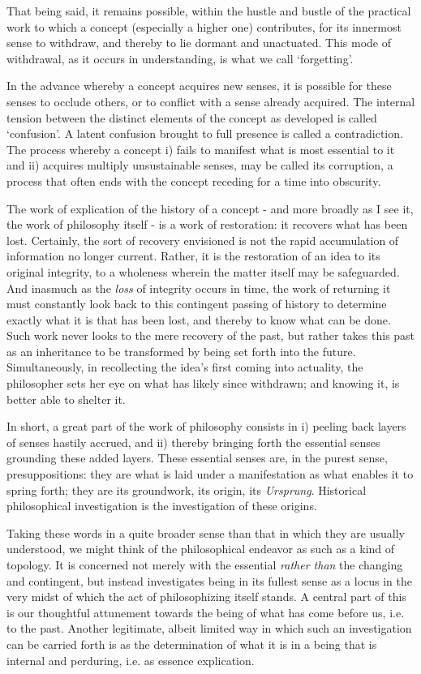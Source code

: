 \documentclass[]{article}
\begin{document}
That being said, it remains possible, within the hustle and bustle of the practical work to which a concept (especially a higher one) contributes, for its innermost sense to withdraw, and thereby to lie dormant and unactuated. This mode of withdrawal, as it occurs in understanding, is what we call `forgetting'.

In the advance whereby a concept acquires new senses, it is possible for these senses to occlude others, or to conflict with a sense already acquired. The internal tension between the distinct elements of the concept as developed is called `confusion'. A latent confusion brought to full presence is called a contradiction. The process whereby a concept i) fails to manifest what is most essential to it and ii) acquires multiply unsustainable senses, may be called its corruption, a process that often ends with the concept receding for a time into obscurity. 

The work of explication of the history of a concept - and more broadly as I see it, the work of philosophy itself - is a work of restoration: it recovers what has been lost. Certainly, the sort of recovery envisioned is not the rapid accumulation of information no longer current. Rather, it is the restoration of an idea to its original integrity, to a wholeness wherein the matter itself may be safeguarded. And inasmuch as the \textit{loss} of integrity occurs in time, the work of returning it must constantly look back to this contingent passing of history to determine exactly what it is that has been lost, and thereby to know what can be done. Such work never looks to the mere recovery of the past, but rather takes this past as an inheritance to be transformed by being set forth into the future. Simultaneously, in recollecting the idea's first coming into actuality, the philosopher sets her eye on what has likely since withdrawn; and knowing it, is better able to shelter it. 

In short, a great part of the work of philosophy consists in i) peeling back layers of senses hastily accrued, and ii) thereby bringing forth the essential senses grounding these added layers. These essential senses are, in the purest sense, presuppositions: they are what is laid under a manifestation as what enables it to spring forth; they are its groundwork, its origin, its \textit{Ursprung}. Historical philosophical investigation is the investigation of these origins.

Taking these words in a quite broader sense than that in which they are usually understood, we might think of the philosophical endeavor as such as a kind of topology. It is concerned not merely with the essential \textit{rather than} the changing and contingent, but instead investigates being in its fullest sense as a locus in the very midst of which the act of philosophizing itself stands. A central part of this is our thoughtful attunement towards the being of what has come before us, i.e. to the past. Another legitimate, albeit limited way in which such an investigation can be carried forth is as the determination of what it is in a being that is internal and perduring, i.e. as essence explication.
\end{document}
